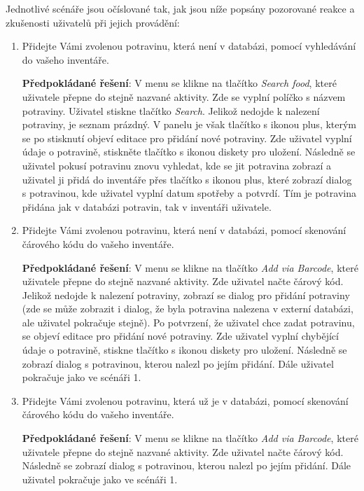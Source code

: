 \documentclass[thesis=B,czech]{FITthesis}[2013/10/20]
\begin{document}
Jednotlivé scénáře jsou očíslované tak, jak jsou níže popsány pozorované reakce a zkušenosti uživatelů při jejich provádění:
\begin{enumerate}
  \item Přidejte Vámi zvolenou potravinu, která není v databázi, pomocí vyhledávání do vašeho inventáře.
    
    \textbf{Předpokládané řešení}: V menu se klikne na tlačítko \textit{Search food}, které uživatele přepne do stejně nazvané aktivity. Zde se vyplní políčko s názvem potraviny. Uživatel stiskne tlačítko \textit{Search}. Jelikož nedojde k nalezení potraviny, je seznam prázdný. V panelu je však tlačítko s ikonou plus, kterým se po stisknutí objeví editace pro přidání nové potraviny. Zde uživatel vyplní údaje o potravině, stiskněte tlačítko s ikonou diskety pro uložení. Následně se uživatel pokusí potravinu znovu vyhledat, kde se jit potravina zobrazí a uživatel ji přidá do inventáře přes tlačítko s ikonou plus, které zobrazí dialog s potravinou, kde uživatel vyplní datum spotřeby a potvrdí. Tím je potravina přidána jak v databázi potravin, tak v inventáři uživatele.

  \item Přidejte Vámi zvolenou potravinu, která není v databázi, pomocí skenování čárového kódu do vašeho inventáře.
    
    \textbf{Předpokládané řešení}: V menu se klikne na tlačítko \textit{Add via Barcode}, které uživatele přepne do stejně nazvané aktivity. Zde uživatel načte čárový kód. Jelikož nedojde k nalezení potraviny, zobrazí se dialog pro přidání potraviny (zde se může zobrazit i dialog, že byla potravina nalezena v externí databázi, ale uživatel pokračuje stejně). Po potvrzení, že uživatel chce zadat potravinu, se objeví editace pro přidání nové potraviny. Zde uživatel vyplní chybějící údaje o potravině, stiskne tlačítko s ikonou diskety pro uložení. Následně se zobrazí dialog s potravinou, kterou nalezl po jejím přidání. Dále uživatel pokračuje jako ve scénáři 1.
    
  \item Přidejte Vámi zvolenou potravinu, která už je v databázi, pomocí skenování čárového kódu do vašeho inventáře.
    
    \textbf{Předpokládané řešení}: V menu se klikne na tlačítko \textit{Add via Barcode}, které uživatele přepne do stejně nazvané aktivity. Zde uživatel načte čárový kód. Následně se zobrazí dialog s potravinou, kterou nalezl po jejím přidání. Dále uživatel pokračuje jako ve scénáři 1.
  

\end{enumerate}
\end{document}
